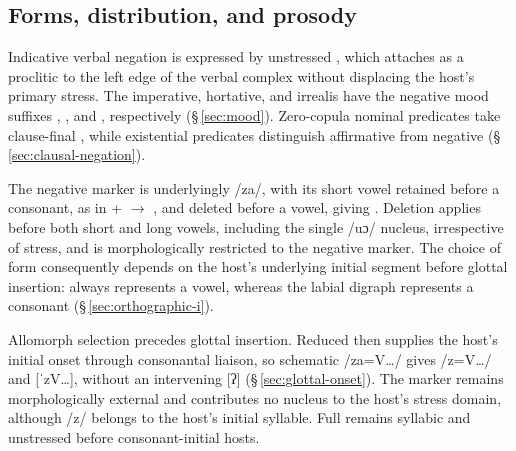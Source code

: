 \subsection{Forms, distribution, and prosody}\label{sec:neg-allomorphy}

Indicative verbal negation is expressed by unstressed , which attaches
as a proclitic to the left edge of the verbal complex without displacing the
host's primary stress. The imperative, hortative, and irrealis have the negative
mood suffixes , , and , respectively
(§\,\ref{sec:mood}). Zero-copula nominal predicates take clause-final
, while existential predicates distinguish affirmative 
from negative
 (§\,\ref{sec:clausal-negation}).

The negative marker is underlyingly /za/, with its short vowel retained before
a consonant, as in  +  $\rightarrow$
, and deleted before a vowel, giving . Deletion applies before both short and long vowels, including the single
/uɔ/ nucleus, irrespective of stress,
and is morphologically restricted to the negative marker. The choice of form consequently depends on the host's
underlying initial segment before glottal insertion:  always represents a vowel, whereas the labial
digraph  represents a consonant (§\,\ref{sec:orthographic-i}).

Allomorph selection precedes glottal insertion. Reduced  then
supplies the host's initial onset through consonantal liaison, so
schematic /za=V\ldots/ gives /z=V\ldots/ and [ˈzV\ldots], without an
intervening [ʔ] (§\,\ref{sec:glottal-onset}). The marker remains
morphologically external and contributes no nucleus to the host's stress
domain, although /z/ belongs to the host's initial syllable. Full
 remains syllabic and unstressed before consonant-initial hosts.

